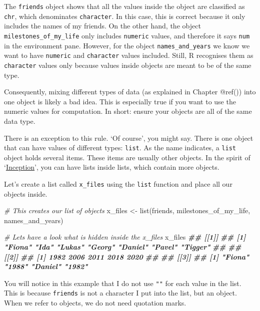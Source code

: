 \documentclass[
]{book}
\newenvironment{Shaded}{\begin{snugshade}}{\end{snugshade}}
\newcommand{\CommentTok}[1]{\textcolor[rgb]{0.56,0.35,0.01}{\textit{#1}}}
\newcommand{\DocumentationTok}[1]{\textcolor[rgb]{0.56,0.35,0.01}{\textbf{\textit{#1}}}}
\newcommand{\FunctionTok}[1]{\textcolor[rgb]{0.00,0.00,0.00}{#1}}
\newcommand{\NormalTok}[1]{#1}
\newcommand{\OtherTok}[1]{\textcolor[rgb]{0.56,0.35,0.01}{#1}}
\begin{document}
The \texttt{friends} object shows that all the values inside the object are classified as \texttt{chr}, which denominates \texttt{character}. In this case, this is correct because it only includes the names of my friends. On the other hand, the object \texttt{milestones\_of\_my\_life} only includes \texttt{numeric} values, and therefore it says \texttt{num} in the environment pane. However, for the object \texttt{names\_and\_years} we know we want to have \texttt{numeric} and \texttt{character} values included. Still, R recognises them as \texttt{character} values only because values inside objects are meant to be of the same type.

Consequently, mixing different types of data (as explained in Chapter @ref()) into one object is likely a bad idea. This is especially true if you want to use the numeric values for computation. In short: ensure your objects are all of the same data type.

There is an exception to this rule. `Of course', you might say. There is one object that can have values of different types: \texttt{list}. As the name indicates, a \texttt{list} object holds several items. These items are usually other objects. In the spirit of `\href{https://www.imdb.com/title/tt1375666/?ref_=ext_shr_lnk}{Inception}', you can have lists inside lists, which contain more objects.

Let's create a list called \texttt{x\_files} using the \texttt{list} function and place all our objects inside.

\begin{Shaded}
\begin{Highlighting}[]
\CommentTok{\# This creates our list of objects}
\NormalTok{x\_files }\OtherTok{\textless{}{-}} \FunctionTok{list}\NormalTok{(friends,}
\NormalTok{               milestones\_of\_my\_life,}
\NormalTok{               names\_and\_years)}

\CommentTok{\# Let\textquotesingle{}s have a look what is hidden inside the x\_files}
\NormalTok{x\_files}
\DocumentationTok{\#\# [[1]]}
\DocumentationTok{\#\# [1] "Fiona"  "Ida"    "Lukas"  "Georg"  "Daniel" "Pavel"  "Tigger"}
\DocumentationTok{\#\# }
\DocumentationTok{\#\# [[2]]}
\DocumentationTok{\#\# [1] 1982 2006 2011 2018 2020}
\DocumentationTok{\#\# }
\DocumentationTok{\#\# [[3]]}
\DocumentationTok{\#\# [1] "Fiona"  "1988"   "Daniel" "1982"}
\end{Highlighting}
\end{Shaded}

You will notice in this example that I do not use \texttt{""} for each value in the list. This is because \texttt{friends} is not a character I put into the list, but an object. When we refer to objects, we do not need quotation marks.
\end{document}
